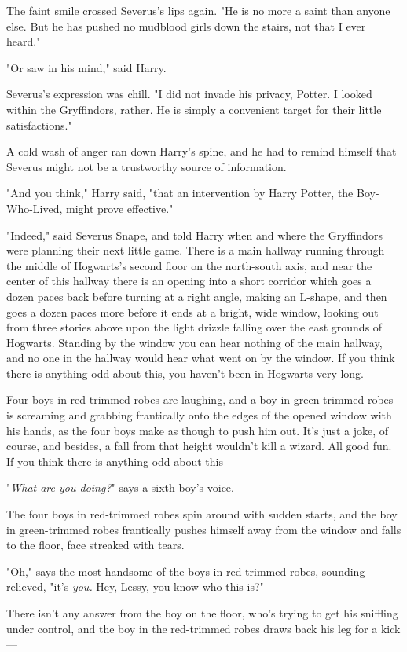 The faint smile crossed Severus's lips again. "He is no more a saint than 
anyone else. But he has pushed no mudblood girls down the stairs, not that I 
ever heard."

"Or saw in his mind," said Harry.

Severus's expression was chill. "I did not invade his privacy, Potter. I looked 
within the Gryffindors, rather. He is simply a convenient target for their 
little satisfactions."

A cold wash of anger ran down Harry's spine, and he had to remind himself that 
Severus might not be a trustworthy source of information.

"And you think," Harry said, "that an intervention by Harry Potter, the 
Boy-Who-Lived, might prove effective."

"Indeed," said Severus Snape, and told Harry when and where the Gryffindors 
were planning their next little game.
\sbreak
There is a main hallway running through the middle of Hogwarts's second floor 
on the north-south axis, and near the center of this hallway there is an 
opening into a short corridor which goes a dozen paces back before turning at a 
right angle, making an L-shape, and then goes a dozen paces more before it ends 
at a bright, wide window, looking out from three stories above upon the light 
drizzle falling over the east grounds of Hogwarts. Standing by the window you 
can hear nothing of the main hallway, and no one in the hallway would hear what 
went on by the window. If you think there is anything odd about this, you 
haven't been in Hogwarts very long.

Four boys in red-trimmed robes are laughing, and a boy in green-trimmed robes 
is screaming and grabbing frantically onto the edges of the opened window with 
his hands, as the four boys make as though to push him out. It's just a joke, 
of course, and besides, a fall from that height wouldn't kill a wizard. All 
good fun. If you think there is anything odd about this---

"\emph{What are you doing?}" says a sixth boy's voice.

The four boys in red-trimmed robes spin around with sudden starts, and the boy 
in green-trimmed robes frantically pushes himself away from the window and 
falls to the floor, face streaked with tears.

"Oh," says the most handsome of the boys in red-trimmed robes, sounding 
relieved, "it's \emph{you.} Hey, Lessy, you know who this is?"

There isn't any answer from the boy on the floor, who's trying to get his 
sniffling under control, and the boy in the red-trimmed robes draws back his 
leg for a kick---

